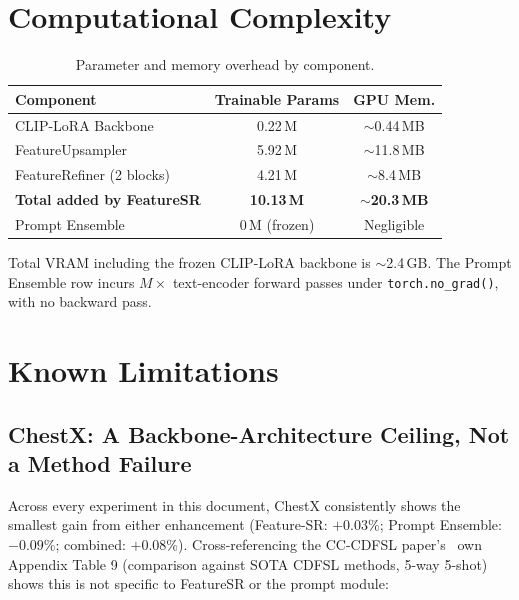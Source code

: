 \documentclass[conference]{IEEEtran}
\begin{document}
\section{Computational Complexity}

\begin{table}[t]
\centering
\caption{Parameter and memory overhead by component.}
\label{tab:complexity}
\small
\begin{tabular}{lcc}
\toprule
Component & Trainable Params & GPU Mem. \\
\midrule
CLIP-LoRA Backbone & 0.22\,M & $\sim$0.44\,MB \\
FeatureUpsampler & 5.92\,M & $\sim$11.8\,MB \\
FeatureRefiner (2 blocks) & 4.21\,M & $\sim$8.4\,MB \\
\textbf{Total added by FeatureSR} & \textbf{10.13\,M} & \textbf{$\sim$20.3\,MB} \\
Prompt Ensemble & 0\,M (frozen) & Negligible \\
\bottomrule
\end{tabular}
\end{table}

Total VRAM including the frozen CLIP-LoRA backbone is $\sim$2.4\,GB. The Prompt Ensemble row incurs $M\times$ text-encoder forward passes under \texttt{torch.no\_grad()}, with no backward pass.

\section{Known Limitations} \label{sec:limitations}

\subsection{ChestX: A Backbone-Architecture Ceiling, Not a Method Failure}

Across every experiment in this document, ChestX consistently shows the smallest gain from either enhancement (Feature-SR: $+0.03\%$; Prompt Ensemble: $-0.09\%$; combined: $+0.08\%$). Cross-referencing the CC-CDFSL paper's~\cite{zhao2026ccdfsl} own Appendix Table 9 (comparison against SOTA CDFSL methods, 5-way 5-shot) shows this is not specific to FeatureSR or the prompt module:
\end{document}
